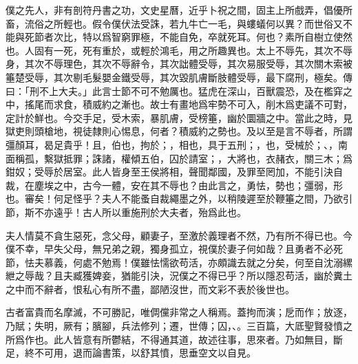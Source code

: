 僕之先人，非有剖符丹書之功，文史星曆，近乎卜祝之間，固主上所戲弄，倡優所畜，流俗之所輕也。假令僕伏法受誅，若九牛亡一毛，與螻蟻何以異？而世俗又不能與死節者次比，特以爲智窮罪極，不能自免，卒就死耳。何也？素所自樹立使然也。人固有一死，死有重於，或輕於鴻毛，用之所趣異也。太上不辱先，其次不辱身，其次不辱理色，其次不辱辭令，其次詘體受辱，其次易服受辱，其次關木索被箠楚受辱，其次剔毛髮嬰金鐵受辱，其次毀肌膚斷肢體受辱，最下腐刑，極矣。傳曰：「刑不上大夫。」此言士節不可不勉厲也。猛虎在深山，百獸震恐，及在檻穽之中，搖尾而求食，積威約之漸也。故士有畫地爲牢勢不可入，削木爲吏議不可對，定計於鮮也。今交手足，受木索，暴肌膚，受榜箠，幽於圜牆之中。當此之時，見獄吏則頭槍地，視徒隸則心惕息，何者？積威約之勢也。及以至是言不辱者，所謂彊顏耳，曷足貴乎！且，伯也，拘於；，相也，具于五刑；，也，受械於；、，南面稱孤，繫獄抵罪；誅諸，權傾五伯，囚於請室；，大將也，衣赭衣，關三木；爲鉗奴；受辱於居室。此人皆身至王侯將相，聲聞鄰國，及罪至罔加，不能引決自裁，在塵埃之中，古今一體，安在其不辱也？由此言之，勇怯，勢也；彊弱，形也。審矣！何足怪乎？夫人不能蚤自裁繩墨之外，以稍陵遲至於鞭箠之間，乃欲引節，斯不亦遠乎！古人所以重施刑於大夫者，殆爲此也。

夫人情莫不貪生惡死，念父母，顧妻子，至激於義理者不然，乃有所不得已也。今僕不幸，早失父母，無兄弟之親，獨身孤立，視僕於妻子何如哉？且勇者不必死節，怯夫慕義，何處不勉焉！僕雖怯懦欲苟活，亦頗識去就之分矣，何至自沈溺縲紲之辱哉？且夫臧獲婢妾，猶能引決，況僕之不得已乎？所以隱忍苟活，幽於糞土之中而不辭者，恨私心有所不盡，鄙陋沒世，而文彩不表於後世也。

古者富貴而名摩滅，不可勝記，唯倜儻非常之人稱焉。蓋拘而演；戹而作；放逐，乃賦；失明，厥有；臏腳，兵法修列；遷，世傳；囚，、。三百篇，大厎聖賢發憤之所爲作也。此人皆意有所鬱結，不得通其道，故述往事，思來者。乃如無目，斷足，終不可用，退而論書策，以舒其憤，思垂空文以自見。

